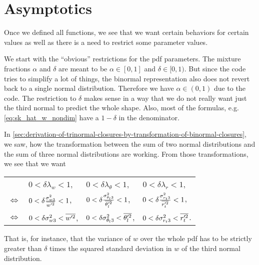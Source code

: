 \chapter{Asymptotics}\label{ch:asymptotics}

Once we defined all functions,
we see that we want certain behaviors for certain values as well as
there is a need to restrict some parameter values.

We start with the \enquote{obvious} restrictions for the \gls{pdf} parameters.
The mixture fractions $\alpha$ and $\delta$ are meant to be $\alpha \in [0,1]$ and $\delta \in [0,1)$.
But since the code tries to simplify a lot of things,
the binormal representation also does not revert back to a single normal distribution.
Therefore we have $\alpha \in (0,1)$ due to the code.
The restriction to $\delta$ makes sense in a way
that we do not really want just the third normal to predict the whole shape.
Also, most of the formulas, e.g. \cref{eq:sk_hat_w_nondim} have a $1-\delta$ in the denominator.

In \cref{sec:derivation-of-trinormal-closures-by-transformation-of-binormal-closures},
we saw,
how the transformation between the sum of two normal distributions
and the sum of three normal distributions are working.
From those transformations, we see that we want
\begin{table}[!htb]
    \centering
    \begin{tabular}{llll}
        &
        $0 < \delta\lambda_w < 1$, &
        $0 < \delta\lambda_\theta < 1$, &
        $0 < \delta\lambda_r < 1$, \\
        $\iff$ &
        $0 < \delta\frac{\sigma_{w3}^2}{\overline{w'^2}} < 1$, &
        $0 < \delta\frac{\sigma_{\theta_l 3}^2}{\overline{\theta_l'^2}} < 1$, &
        $0 < \delta\frac{\sigma_{r_t 3}^2}{\overline{r_t'^2}} < 1$, \\
        $\iff$ &
        $0 < \delta\sigma_{w3}^2 < \overline{w'^2}$, &
        $0 < \delta\sigma_{\theta_l 3}^2 < \overline{\theta_l'^2}$, &
        $0 < \delta\sigma_{r_t 3}^2 < \overline{r_t'^2}$.
    \end{tabular}
    \label{tab:table_asymp_2}
\end{table}
That is, for instance,
that the variance of $w$ over the whole \gls{pdf} has to be strictly greater than $\delta$ times
the squared standard deviation in $w$ of the third normal distribution.


